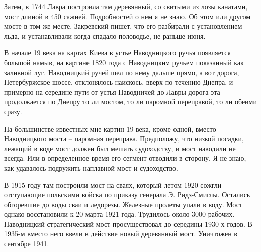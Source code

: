 Затем, в 1744 Лавра построила там деревянный, со свитыми из лозы канатами, мост длиной в 450 сажней. Подробностей о нем я не знаю. Об этом или другом мосте в том же месте, Закревский пишет, что его разбирали с установлением льда, и устанавливали когда спадало половодье, не раньше июня.

В начале 19 века на картах Киева в устье Наводницкого ручья появляется большой намыв, на картине 1820 года с Наводницким ручьем показанный как заливной луг. Наводницкий ручей шел по нему дальше прямо, а вот дорога, Петербуржское шоссе, отклонялось наискось, вверх по течению Днепра, и примерно на середине пути от устья Наводничей до Лавры дорога эта продолжается по Днепру то ли мостом, то ли паромной переправой, то ли обеими сразу.

На большинстве известных мне картин 19 века, кроме одной, вместо Наводницкого моста – паромная переправа. Предположу, что низкой посадки, лежащий в воде мост должен был мешать судоходству, и мост наводили не всегда. Или в определенное время его сегмент отводили в сторону. Я не знаю, как удавалось подружить наплавной мост и судоходство.

В 1915 году там построили мост на сваях, который летом 1920 сожгли отступающие польскими войска по приказу генерала Э. Ридз-Смиглы. Остались обгоревшие до воды сваи и ледорезы. Железные пролеты упали в воду. Мост однако восстановили к 20 марта 1921 года. Трудилось около 3000 рабочих. 
Наводницкий стратегический мост просуществовал до середины 1930-х годов. В 1935-м вместо него ввели в действие новый деревянный мост. Уничтожен в сентябре 1941.\\


\medskip







